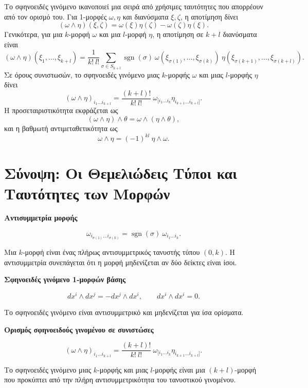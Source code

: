 \documentclass[12pt]{article}
\begin{document}
Το σφηνοειδές γινόμενο ικανοποιεί μια σειρά από χρήσιμες ταυτότητες που απορρέουν από τον ορισμό του. Για 1-μορφές \( \omega, \eta \) και διανύσματα \( \xi, \zeta \), η αποτίμηση δίνει
\[
(\omega \wedge \eta)(\xi, \zeta) = \omega(\xi) \eta(\zeta) - \omega(\zeta) \eta(\xi). \tag{47}
\]
Γενικότερα, για μια \( k \)-μορφή \( \omega \) και μια \( l \)-μορφή \( \eta \), η αποτίμηση σε \( k+l \) διανύσματα είναι
\[
(\omega \wedge \eta)(\xi_1, \dots, \xi_{k+l}) = \frac{1}{k! \ l!} \sum_{\sigma \in S_{k+l}} \operatorname{sgn}(\sigma) \ \omega(\xi_{\sigma(1)}, \dots, \xi_{\sigma(k)}) \ \eta(\xi_{\sigma(k+1)}, \dots, \xi_{\sigma(k+l)}). \tag{48}
\]
Σε όρους συνιστωσών, το σφηνοειδές γινόμενο μιας \( k \)-μορφής \( \omega \) και μιας \( l \)-μορφής \( \eta \) δίνει
\[
(\omega \wedge \eta)_{i_1 \dots i_{k+l}} = \frac{(k+l)!}{k! \ l!} \ \omega_{[i_1 \dots i_k} \eta_{i_{k+1} \dots i_{k+l}]}. \tag{49}
\]
Η προσεταιριστικότητα εκφράζεται ως
\[
(\omega \wedge \eta) \wedge \theta = \omega \wedge (\eta \wedge \theta), \tag{50}
\]
και η βαθμωτή αντιμεταθετικότητα ως
\[
\omega \wedge \eta = (-1)^{kl} \ \eta \wedge \omega. \tag{51}
\]

\section{Σύνοψη: Οι Θεμελιώδεις Τύποι και Ταυτότητες των Μορφών}

\textbf{Αντισυμμετρία μορφής}

\[
\omega_{i_{\sigma(1)} \dots i_{\sigma(k)}} = \operatorname{sgn}(\sigma) \ \omega_{i_1 \dots i_k}. \tag{37}
\]

Μια \( k \)-μορφή είναι ένας πλήρως αντισυμμετρικός τανυστής τύπου \( (0,k) \). Η αντισυμμετρία συνεπάγεται ότι η μορφή μηδενίζεται αν δύο δείκτες είναι ίσοι.

\textbf{Σφηνοειδές γινόμενο 1-μορφών βάσης}

\[
dx^i \wedge dx^j = - dx^j \wedge dx^i, \qquad dx^i \wedge dx^i = 0. \tag{40}
\]

Το σφηνοειδές γινόμενο είναι αντισυμμετρικό και μηδενίζεται για ίσα ορίσματα.

\textbf{Ορισμός σφηνοειδούς γινομένου σε συνιστώσες}

\[
(\omega \wedge \eta)_{i_1 \dots i_{k+l}} = \frac{(k+l)!}{k! \ l!} \ \omega_{[i_1 \dots i_k} \eta_{i_{k+1} \dots i_{k+l}]}. \tag{49}
\]

Το σφηνοειδές γινόμενο μιας \( k \)-μορφής και μιας \( l \)-μορφής είναι μια \( (k+l) \)-μορφή που προκύπτει από την πλήρη αντισυμμετρικότητα του τανυστικού γινομένου.
\end{document}
